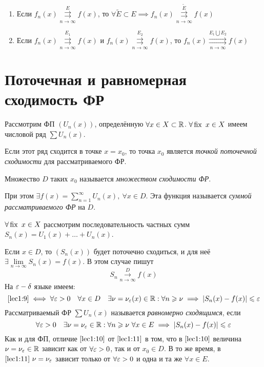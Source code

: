 \documentclass[../../main.tex]{subfiles}
\begin{document}
\begin{rems}
	\;
	
\begin{enumerate}
\item Если $f_n(x) \overset{E}
{\underset{n \to \infty}\rightrightarrows} f(x)$, то 
$\forall \widetilde{E} \subset E \implies f_n(x) \overset{\widetilde{E}}
{\underset{n \to \infty}\rightrightarrows} f(x)$

\item Если $f_n(x) \overset{E_1}
{\underset{n \to \infty}\rightrightarrows} f(x)$ и 
$f_n(x) \overset{E_2}
{\underset{n \to \infty}\rightrightarrows} f(x)$, то
$f_n(x) \overset{E_1 \bigcup E_2}
{\underset{n \to \infty}\rightrightarrows} f(x)$
\end{enumerate}

\end{rems}	

\section{Поточечная и равномерная сходимость ФР}

Рассмотрим ФП $(U_n(x))$, определённую $\forall x \in X \subset \mathbb{R}$. 
$\forall \operatorname{fix} \ x \in X$ имеем числовой ряд $\sum U_n(x)$. 

Если этот ряд сходится в точке $x = x_0$, то точка $x_0$ является 
\emph{точкой поточечной сходимости} для рассматриваемого ФР. 

Множество $D$ таких $x_0$ называется \emph{множеством сходимости ФР}.

При этом $\exists f(x) = \sum\limits_{n=1}^{\infty} U_n(x),\ \forall x \in D$.
Эта функция называется \emph{суммой рассматриваемого ФР} на $D$.

$\forall \operatorname{fix} \ x \in X$ рассмотрим последовательность частных сумм 
$S_n(x) = U_1(x) + \ldots + U_n(x)$. 	

Если $x \in D$, то $(S_n(x))$ будет поточечно сходиться, и для неё 
$\exists \underset{n \to \infty}{\lim} S_n(x) = f(x)$. В этом случае
пишут 
\begin{equation}
\label{lec1:9}
S_n \overset{D}{\underset{n \to \infty}\longrightarrow} f(x)
\end{equation}
На $\varepsilon-\delta$ языке имеем:
\begin{equation}
\label{lec1:10}
\eqref{lec1:9} \iff \forall \varepsilon > 0\quad
\forall x \in D \quad \exists \nu = \nu_\varepsilon(x) \in \mathbb{R} :
\forall n \geqslant \nu \implies |S_n(x) - f(x)| \leqslant \varepsilon 
\end{equation}
Рассматриваемый ФР $\sum U_n(x)$ называется \emph{равномерно сходящимся},
если  
\begin{equation}
\label{lec1:11}
\forall \varepsilon > 0 \quad \exists \nu = \nu_\varepsilon \in \mathbb{R} :
\forall n \geqslant \nu \ \forall x \in E \implies 
|S_n(x) - f(x)| \leqslant \varepsilon
\end{equation}
Как и для ФП, отличие $\eqref{lec1:10}$ от $\eqref{lec1:11}$ в том,
что в $\eqref{lec1:10}$ величина $\nu = \nu_\varepsilon \in \mathbb{R}$ 
зависит как от $\forall \varepsilon > 0$, так и от $x_0 \in D$. В то же время, в 
$\eqref{lec1:11} \ \nu = \nu_\varepsilon$ зависит только от $\forall \varepsilon > 0$ и 
одна и та же $\forall x \in E$.  
\end{document}
